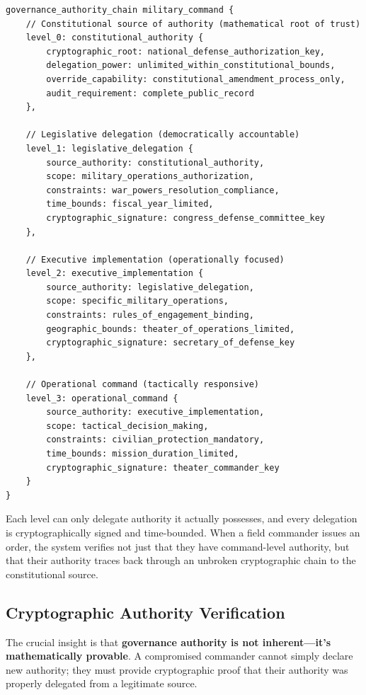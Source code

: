 \begin{lstlisting}[language=rift, caption=Distributed Military Command Governance]
governance_authority_chain military_command {
    // Constitutional source of authority (mathematical root of trust)
    level_0: constitutional_authority {
        cryptographic_root: national_defense_authorization_key,
        delegation_power: unlimited_within_constitutional_bounds,
        override_capability: constitutional_amendment_process_only,
        audit_requirement: complete_public_record
    },
    
    // Legislative delegation (democratically accountable)
    level_1: legislative_delegation {
        source_authority: constitutional_authority,
        scope: military_operations_authorization,
        constraints: war_powers_resolution_compliance,
        time_bounds: fiscal_year_limited,
        cryptographic_signature: congress_defense_committee_key
    },
    
    // Executive implementation (operationally focused)
    level_2: executive_implementation {
        source_authority: legislative_delegation,
        scope: specific_military_operations,
        constraints: rules_of_engagement_binding,
        geographic_bounds: theater_of_operations_limited,
        cryptographic_signature: secretary_of_defense_key
    },
    
    // Operational command (tactically responsive)
    level_3: operational_command {
        source_authority: executive_implementation,
        scope: tactical_decision_making,
        constraints: civilian_protection_mandatory,
        time_bounds: mission_duration_limited,
        cryptographic_signature: theater_commander_key
    }
}
\end{lstlisting}

Each level can only delegate authority it actually possesses, and every delegation is cryptographically signed and time-bounded. When a field commander issues an order, the system verifies not just that they have command-level authority, but that their authority traces back through an unbroken cryptographic chain to the constitutional source.

\subsection{Cryptographic Authority Verification}

The crucial insight is that \textbf{governance authority is not inherent—it's mathematically provable}. A compromised commander cannot simply declare new authority; they must provide cryptographic proof that their authority was properly delegated from a legitimate source.

